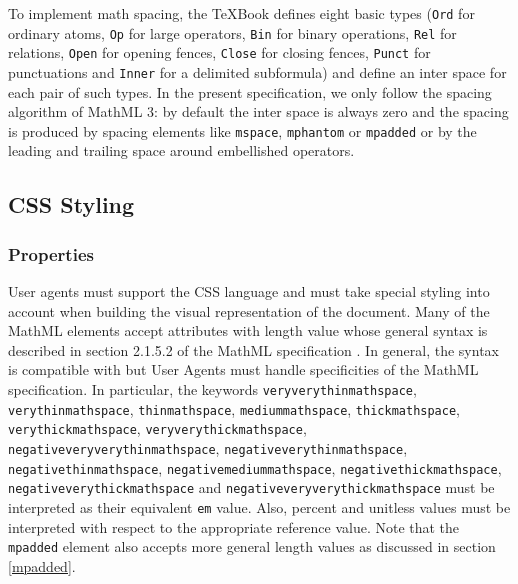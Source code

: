 To implement math spacing, the TeXBook defines eight basic types
({\tt Ord} for ordinary atoms, {\tt Op} for large operators,
{\tt Bin} for binary operations, {\tt Rel} for relations,
{\tt Open} for opening fences, {\tt Close} for closing fences,
{\tt Punct} for punctuations and {\tt Inner} for a delimited subformula) and
define an inter space for each pair of such types. In the present specification,
we only follow the spacing algorithm of MathML 3: by default the inter space
is always zero and the spacing is produced by spacing elements like
{\tt mspace}, {\tt mphantom} or {\tt mpadded} or by the leading and trailing
space around embellished operators.

\subsection{CSS Styling}

\subsubsection{Properties}\label{CSSProperties}

User agents must support the CSS language \cite{CSS2} and must take special
styling into account when building the visual representation of the document.
Many of the MathML elements accept attributes with length value whose
general syntax is described in section 2.1.5.2 of the MathML specification
\cite{MathML3}. In general,
the syntax is compatible with \cite{CSS2} but User Agents must handle
specificities of the MathML specification. In particular, the keywords
{\tt veryverythinmathspace},
{\tt verythinmathspace},
{\tt thinmathspace},
{\tt mediummathspace},
{\tt thickmathspace},
{\tt verythickmathspace},
{\tt veryverythickmathspace},
{\tt negativeveryverythinmathspace},
{\tt negativeverythinmathspace},
{\tt negativethinmathspace},
{\tt negativemediummathspace},
{\tt negativethickmathspace},
{\tt negativeverythickmathspace} and
{\tt negativeveryverythickmathspace} must be interpreted as their
equivalent {\tt em} value. Also, percent and unitless values must be interpreted
with respect to the appropriate reference value. Note that the {\tt mpadded}
element also accepts more general length values as discussed in section
\ref{mpadded}.

